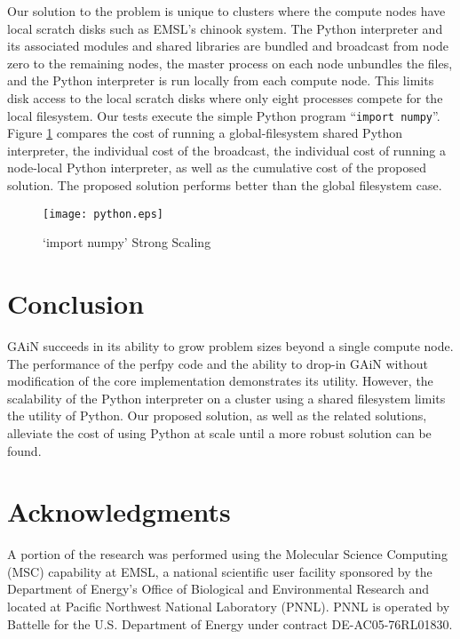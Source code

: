 \documentclass{sig-alt-release2}
\begin{document}
Our solution to the problem is unique to clusters where the compute nodes have
local scratch disks such as EMSL's chinook system. The Python interpreter and
its associated modules and shared libraries are bundled and broadcast from node
zero to the remaining nodes, the master process on each node unbundles the
files, and the Python interpreter is run locally from each compute node. This
limits disk access to the local scratch disks where only eight processes
compete for the local filesystem. Our tests execute the simple Python program
``\texttt{import numpy}''. Figure \ref{fig:python} compares the cost of running
a global-filesystem shared Python interpreter, the individual cost of the
broadcast, the individual cost of running a node-local Python interpreter, as
well as the cumulative cost of the proposed solution. The proposed solution
performs better than the global filesystem case.

\begin{figure}
\centering
\texttt{[image: python.eps]}
\caption{`import numpy' Strong Scaling}
\label{fig:python}
\end{figure}

\section{Conclusion}
GAiN succeeds in its ability to grow problem sizes beyond a single compute
node. The performance of the perfpy code and the ability to drop-in GAiN
without modification of the core implementation demonstrates its utility. However, the scalability of the Python interpreter on a cluster using a shared filesystem limits the utility of Python. Our proposed solution, as well as the related solutions\cite{Scu11,Man11}, alleviate the cost of using Python at scale until a more robust solution can be found.

\section{Acknowledgments}
A portion of the research was performed using the Molecular Science Computing
(MSC) capability at EMSL, a national scientific user facility sponsored by the
Department of Energy's Office of Biological and Environmental Research and
located at Pacific Northwest National Laboratory (PNNL). PNNL is operated by
Battelle for the U.S. Department of Energy under contract DE-AC05-76RL01830.

%


%
%
\end{document}

